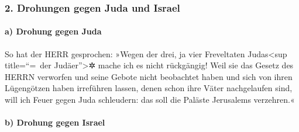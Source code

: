\hypertarget{drohungen-gegen-juda-und-israel}{%
\subsubsection{2. Drohungen gegen Juda und
Israel}\label{drohungen-gegen-juda-und-israel}}

\hypertarget{a-drohung-gegen-juda}{%
\paragraph{a) Drohung gegen Juda}\label{a-drohung-gegen-juda}}

So hat der HERR gesprochen: »Wegen der drei, ja vier
Freveltaten Judas\textless sup title=``=~der Judäer''\textgreater✲ mache
ich es nicht rückgängig! Weil sie das Gesetz des HERRN verworfen und
seine Gebote nicht beobachtet haben und sich von ihren Lügengötzen haben
irreführen lassen, denen schon ihre Väter nachgelaufen sind,
will ich Feuer gegen Juda schleudern: das soll die Paläste
Jerusalems verzehren.«

\hypertarget{b-drohung-gegen-israel}{%
\paragraph{b) Drohung gegen Israel}\label{b-drohung-gegen-israel}}

